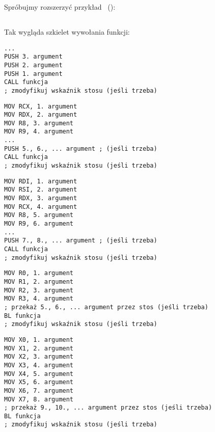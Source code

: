 \mysection{\PrintfSeveralArgumentsSectionName}

Spróbujmy rozszerzyć przykład \emph{\HelloWorldSectionName}~():







\subsection{\Conclusion{}}

Tak wygląda szkielet wywołania funkcji:

\begin{lstlisting}[caption=x86,style=customasmx86]
...
PUSH 3. argument
PUSH 2. argument
PUSH 1. argument
CALL funkcja
; zmodyfikuj wskaźnik stosu (jeśli trzeba)
\end{lstlisting}

\begin{lstlisting}[caption=x64 (MSVC),style=customasmx86]
MOV RCX, 1. argument
MOV RDX, 2. argument
MOV R8, 3. argument
MOV R9, 4. argument
...
PUSH 5., 6., ... argument ; (jeśli trzeba)
CALL funkcja
; zmodyfikuj wskaźnik stosu (jeśli trzeba)
\end{lstlisting}

\begin{lstlisting}[caption=x64 (GCC),style=customasmx86]
MOV RDI, 1. argument
MOV RSI, 2. argument
MOV RDX, 3. argument
MOV RCX, 4. argument
MOV R8, 5. argument
MOV R9, 6. argument
...
PUSH 7., 8., ... argument ; (jeśli trzeba)
CALL funkcja
; zmodyfikuj wskaźnik stosu (jeśli trzeba)
\end{lstlisting}

\begin{lstlisting}[caption=ARM,style=customasmARM]
MOV R0, 1. argument
MOV R1, 2. argument
MOV R2, 3. argument
MOV R3, 4. argument
; przekaż 5., 6., ... argument przez stos (jeśli trzeba)
BL funkcja
; zmodyfikuj wskaźnik stosu (jeśli trzeba)
\end{lstlisting}

\begin{lstlisting}[caption=ARM64,style=customasmARM]
MOV X0, 1. argument
MOV X1, 2. argument
MOV X2, 3. argument
MOV X3, 4. argument
MOV X4, 5. argument
MOV X5, 6. argument
MOV X6, 7. argument
MOV X7, 8. argument
; przekaż 9., 10., ... argument przez stos (jeśli trzeba)
BL funkcja
; zmodyfikuj wskaźnik stosu (jeśli trzeba)
\end{lstlisting}


